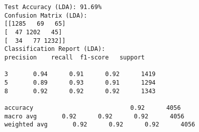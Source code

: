 \documentclass[letterpaper]{article}
\begin{document}
	\begin{minipage}{\linewidth}
	\begin{Verbatim}
     Test Accuracy (LDA): 91.69%
     Confusion Matrix (LDA):
     [[1285   69   65]
     [  47 1202   45]
     [  34   77 1232]]
     Classification Report (LDA):
     precision    recall  f1-score   support
     
     3       0.94      0.91      0.92      1419
     5       0.89      0.93      0.91      1294
     8       0.92      0.92      0.92      1343
     
     accuracy                           0.92      4056
     macro avg       0.92      0.92      0.92      4056
     weighted avg       0.92      0.92      0.92      4056
	\end{Verbatim}
\end{minipage}
\end{document}
